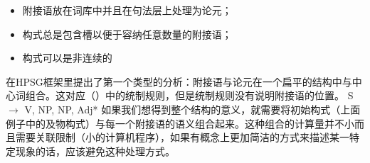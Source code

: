 \begin{itemize}
\item 附接语放在词库中\citep*{NB94,BMS2001a}并且在句法层上处理为论元；
\item 构式总是包含槽以便于容纳任意数量的附接语；
\item 构式可以是非连续的
\end{itemize}
 \citet{Kasper94a}在HPSG框架里提出了第一个类型的分析：附接语与论元在一个扁平的结构中与中心词组合。这对应（）中的统制规则，但是统制规则没有说明附接语的位置。
\ea
S $\to$ V, NP, NP, Adj*
\z
如果我们想得到整个结构的意义，就需要将初始构式（上面例子中的及物构式）与每一个附接语的语义组合起来。这种组合的计算量并不小而且需要关联限制（小的计算机程序），如果有概念上更加简洁的方式来描述某一特定现象的话，应该避免这种处理方式。

